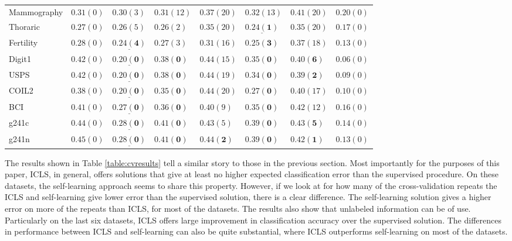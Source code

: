 \documentclass{llncs}
\begin{document}
\begin{table}
\begin{tabular}{l|lllllll}
Mammography & $0.31 (0)$& $0.30 (3)$& $0.31 (12)$& $0.37 (20)$& $0.32 (13)$& $0.41 (20)$& $0.20 (0)$\\ 
Thoraric & $0.27 (0)$& $0.26 (5)$& $0.26 (2)$& $0.35 (20)$& $\mathbf{\underline{0.24 (1)}} $& $0.35 (20)$& $0.17 (0)$\\ 
Fertility & $0.28 (0)$& $\mathbf{\underline{0.24 (4)}} $& $0.27 (3)$& $0.31 (16)$& $\mathbf{0.25 (3)} $& $0.37 (18)$& $0.13 (0)$\\ 
Digit1 & $0.42 (0)$& $\mathbf{\underline{0.20 (0)}} $& $\mathbf{0.38 (0)} $& $0.44 (15)$& $\mathbf{0.35 (0)} $& $\mathbf{0.40 (6)} $& $0.06 (0)$\\ 
USPS & $0.42 (0)$& $\mathbf{\underline{0.20 (0)}} $& $\mathbf{0.38 (0)} $& $0.44 (19)$& $\mathbf{0.34 (0)} $& $\mathbf{0.39 (2)} $& $0.09 (0)$\\ 
COIL2 & $0.38 (0)$& $\mathbf{\underline{0.20 (0)}} $& $\mathbf{0.35 (0)} $& $0.44 (20)$& $\mathbf{0.27 (0)} $& $0.40 (17)$& $0.10 (0)$\\ 
BCI & $0.41 (0)$& $\mathbf{\underline{0.27 (0)}} $& $\mathbf{0.36 (0)} $& $0.40 (9)$& $\mathbf{0.35 (0)} $& $0.42 (12)$& $0.16 (0)$\\ 
g241c & $0.44 (0)$& $\mathbf{\underline{0.28 (0)}} $& $\mathbf{0.41 (0)} $& $0.43 (5)$& $\mathbf{0.39 (0)} $& $\mathbf{0.43 (5)} $& $0.14 (0)$\\ 
g241n & $0.45 (0)$& $\mathbf{\underline{0.28 (0)}} $& $\mathbf{0.41 (0)} $& $\mathbf{0.44 (2)} $& $\mathbf{0.39 (0)} $& $\mathbf{0.42 (1)} $& $0.13 (0)$\\ 
\end{tabular}
\end{table}

The results shown in Table \ref{table:cvresults} tell a similar story to those in the previous section. Most importantly for the purposes of this paper, ICLS, in general, offers solutions that give at least no higher expected classification error than the supervised procedure. On these datasets, the self-learning approach seems to share this property. However, if we look at for how many of the cross-validation repeats the ICLS and self-learning give lower error than the supervised solution, there is a clear difference. The self-learning solution gives a higher error on more of the repeats than ICLS, for most of the datasets. The results also show that unlabeled information can be of use. Particularly on the last six datasets, ICLS offers large improvement in classification accuracy over the supervised solution. The differences in performance between ICLS and self-learning can also be quite substantial, where ICLS outperforms self-learning on most of the datasets.
\end{document}
